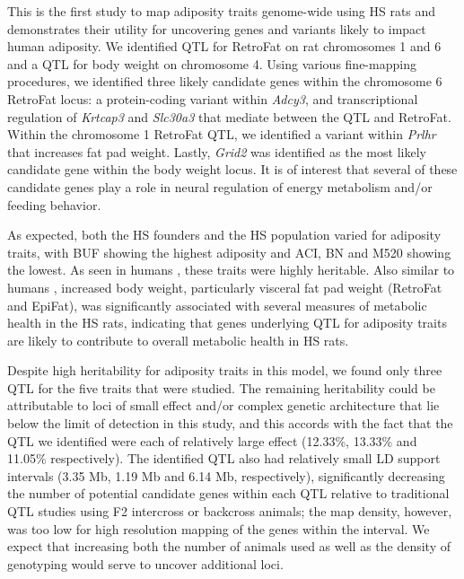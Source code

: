 This is the first study to map adiposity traits genome-wide using HS rats and demonstrates their utility for uncovering genes and variants likely to impact human adiposity. We identified QTL for RetroFat on rat chromosomes 1 and 6 and a QTL for body weight on chromosome 4.  Using various fine-mapping procedures, we identified three likely candidate genes within the chromosome 6 RetroFat locus: a protein-coding variant within \textit{Adcy3}, and transcriptional regulation of \textit{Krtcap3} and \textit{Slc30a3} that mediate between the QTL and RetroFat. Within the chromosome 1 RetroFat QTL, we identified a variant within \textit{Prlhr} that increases fat pad weight.  Lastly, \textit{Grid2} was identified as the most likely candidate gene within the body weight locus. It is of interest that several of these candidate genes play a role in neural regulation of energy metabolism and/or feeding behavior.

As expected, both the HS founders and the HS population varied for adiposity traits, with BUF showing the highest adiposity and ACI, BN and M520 showing the lowest. As seen in humans \citep{Stunkard1986, Katzmarzyk2000}, these traits were highly heritable.  Also similar to humans \citep{Emdin2017a}, increased body weight, particularly visceral fat pad weight (RetroFat and EpiFat), was significantly associated with several measures of metabolic health in the HS rats, indicating that genes underlying QTL for adiposity traits are likely to contribute to overall metabolic health in HS rats.

Despite high heritability for adiposity traits in this model, we found only three QTL for the five traits that were studied.  The remaining heritability could be attributable to loci of small effect and/or complex genetic architecture that lie below the limit of detection in this study, and this accords with the fact that the QTL we identified were each of relatively large effect (12.33\%, 13.33\% and 11.05\% respectively). The identified QTL also had relatively small LD support intervals (3.35 Mb, 1.19 Mb and 6.14 Mb, respectively), significantly decreasing the number of potential candidate genes within each QTL relative to traditional QTL studies using F2 intercross or backcross animals; the map density, however, was too low for high resolution mapping of the genes within the interval. We expect that increasing both the number of animals used as well as the density of genotyping would serve to uncover additional loci.  

